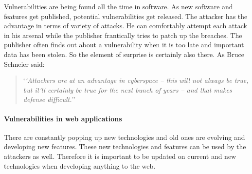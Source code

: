 %
%
%
%
% 



\pagestyle{empty} %

\cleardoublepage
{}
\pagestyle{fancy} %

Vulnerabilities are being found all the time in software.
As new software and features get published, potential vulnerabilities get released.
The attacker has the advantage in terms of variety of attacks.
He can comfortably attempt each attack in his arsenal while the publisher frantically tries to patch up the breaches.
The publisher often finds out about a vulnerability when it is too late and important data has been stolen.
So the element of surprise is certainly also there.
As Bruce Schneier said:
\begin{quote}
`\textit{`Attackers are at an advantage in cyberspace – this will not always be true, but it’ll certainly be true for the next bunch of years – and that makes defense difficult.}''\cite{schneier_interview}  
\end{quote}

\paragraph{Vulnerabilities in web applications}
There are constantly popping up new technologies and old ones are evolving and developing new features.
These new technologies and features can be used by the attackers as well.
Therefore it is important to be updated on current and new technologies when developing anything to the web.\cite{web_security_importance}

